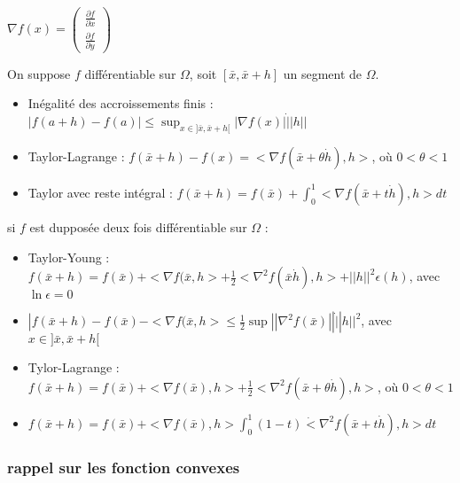 	$\nabla f(x) = \left( \begin{array}{c} \frac{\partial f}{\partial x} \\ \frac{\partial f}{\partial y} \end{array}\right)$
	
	On suppose $f$ différentiable sur $\Omega$, soit $[\bar{x}, \bar{x}+h]$ un segment de $\Omega$.
	\begin{itemize}
		\item Inégalité des accroissements finis : $|f(a+h) -f(a)| \leq \sup_{ x \in ]\bar{x}, \bar{x}+h[ } |\nabla f(x)| \dot ||h||$
		\item Taylor-Lagrange : $f(\bar{x}+h) - f(x) = <\nabla f(\bar{x}+\theta \dot h), h>$, où $0<\theta <1$
		\item Taylor avec reste intégral : $f(\bar{x}+h) = f(\bar{x}) + \int_0^1 <\nabla f(\bar{x}+ t \dot h), h> dt$
	\end{itemize}
	si $f$ est dupposée deux fois différentiable sur $\Omega$ :
	\begin{itemize}
		\item Taylor-Young : $f(\bar{x}+h) = f(\bar{x}) + <\nabla f(\bar{x}, h> + \frac{1}{2} <\nabla^2 f(\bar{x} \dot h), h> + ||h||^2 \epsilon (h)$, avec $\ln \epsilon = 0$
		\item $|f(\bar{x}+h) - f(\bar{x}) - <\nabla f(\bar{x}, h> \leq \frac{1}{2} \sup || \nabla^2 f(\bar{x})|| \dot ||h||^2$, avec $x \in ]\bar{x}, \bar{x}+h[$
		\item Tylor-Lagrange : $f(\bar{x}+h) = f(\bar{x}) + <\nabla f(\bar{x}), h> + \frac{1}{2} <\nabla^2 f(\bar{x}+ \theta \dot h), h>$, où $0< \theta <1$
		\item $f(\bar{x}+h) = f(\bar{x}) + <\nabla f(\bar{x}), h> \int_0^1 (1-t) \dot <\nabla^2 f(\bar{x}+ t \dot h), h> dt$
	\end{itemize}
	
		\subsubsection{rappel sur les fonction convexes}
		
		
		
